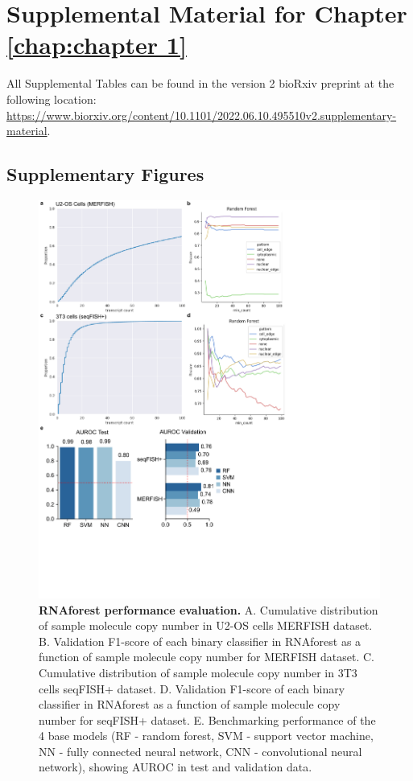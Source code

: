 \appendix{}

\chapter{Supplemental Material for Chapter \ref{chap:chapter 1}}

All Supplemental Tables can be found in the version 2 bioRxiv preprint at the following location: \href{https://www.biorxiv.org/content/10.1101/2022.06.10.495510v2.supplementary-material}{https://www.biorxiv.org/content/10.1101/2022.06.10.495510v2.supplementary-material}.

\section{Supplementary Figures}

\begin{figure}[h]
    \centering
    \includegraphics[width=\textwidth]{1_figures-and-files/FigS1.pdf}
    \caption[RNAforest performance evaluation.]{\textbf{RNAforest performance evaluation.} A. Cumulative distribution of sample molecule copy number in U2-OS cells MERFISH dataset. B. Validation F1-score of each binary classifier in RNAforest as a function of sample molecule copy number for MERFISH dataset. C. Cumulative distribution of sample molecule copy number in 3T3 cells seqFISH+ dataset. D. Validation F1-score of each binary classifier in RNAforest as a function of sample molecule copy number for seqFISH+ dataset. E. Benchmarking performance of the 4 base models (RF - random forest, SVM - support vector machine, NN - fully connected neural network, CNN - convolutional neural network), showing AUROC in test and validation data.}\label{fig:supplement rnaforest evaluation}
\end{figure}


